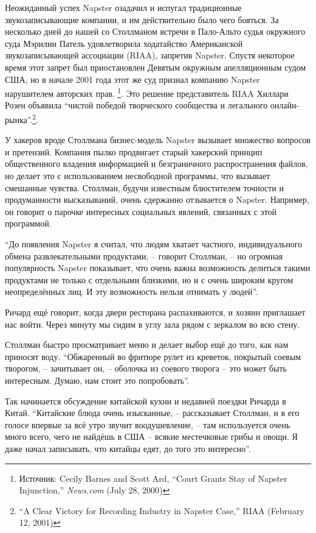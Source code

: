 Неожиданный успех Napster озадачил и испугал традиционные звукозаписывающие компании, и им действительно было чего бояться. За несколько дней до нашей со Столлманом встречи в Пало-Альто судья окружного суда Мэрилин Патель удовлетворила ходатайство Американской звукозаписывающей ассоциации (RIAA), запретив Napster. Спустя некоторое время этот запрет был приостановлен Девятым окружным апелляционным судом США, но в начале 2001 года этот же суд признал компанию Napster нарушителем авторских прав. \footnote{Источник: Cecily Barnes and Scott Ard, \enquote{Court Grants Stay of Napster Injunction,} \textit{News.com} (July 28, 2000)}. Это решение представитель RIAA Хиллари Розен объявила \enquote{чистой победой творческого сообщества и легального онлайн-рынка}.\footnote{\enquote{A Clear Victory for Recording Industry in Napster Case,} RIAA (February 12, 2001)}.

У хакеров вроде Столлмана бизнес-модель Napster вызывает множество вопросов и претензий. Компания пылко продвигает старый хакерский принцип общественного владения информацией и безграничного распространения файлов, но делает это с использованием несвободной программы, что вызывает смешанные чувства. Столлман, будучи известным блюстителем точности и продуманности высказываний, очень сдержанно отзывается о Napster. Например, он говорит о парочке интересных социальных явлений, связанных с этой программой.

\enquote{До появления Napster я считал, что людям хватает частного, индивидуального обмена развлекательными продуктами, -- говорит Столлман, -- но огромная популярность Napster показывает, что очень важна возможность делиться такими продуктами не только с отдельными близкими, но и с очень широким кругом неопределённых лиц. И эту возможность нельзя отнимать у людей}.

Ричард ещё говорит, когда двери ресторана распахиваются, и хозяин приглашает нас войти. Через минуту мы сидим в углу зала рядом с зеркалом во всю стену.

Столлман быстро просматривает меню и делает выбор ещё до того, как нам приносят воду. \enquote{Обжаренный во фритюре рулет из креветок, покрытый соевым творогом, -- зачитывает он, -- оболочка из соевого творога -- это может быть интересным. Думаю, нам стоит это попробовать}.

Так начинается обсуждение китайской кухни и недавней поездки Ричарда в Китай. \enquote{Китайские блюда очень изысканные, -- рассказывает Столлман, и в его голосе впервые за всё утро звучит воодушевление, -- там используется очень много всего, чего не найдёшь в США -- всякие местечковые грибы и овощи. Я даже начал записывать, что китайцы едят, до того это интересно}.

